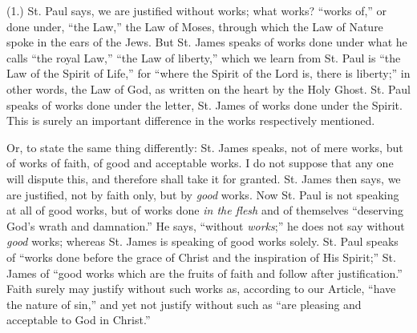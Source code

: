 (1.) St. Paul says, we are justified without works; what works?
``works of,'' or done under, ``the Law,'' the Law of
Moses, through which the Law of Nature spoke in the ears of the
Jews. But St. James speaks of works done under what he calls ``the
royal Law,'' ``the Law of liberty,'' which we learn from
St. Paul is ``the Law of the Spirit of Life,'' for ``where
the Spirit of the Lord is, there is liberty;'' in other words, the
Law of God, as written on the heart by the Holy Ghost. St. Paul speaks
of works done under the letter, St. James of works done under the
Spirit. This is surely an important difference in the works
respectively mentioned.

Or, to state the same thing differently: St. James speaks, not of
mere works, but of works of faith, of good and acceptable works. I do
not suppose that any one will dispute this, and therefore shall take
it for granted. St. James then says, we are justified, not by faith
only, but by \emph{good} works. Now St. Paul is not speaking at all of good
works, but of works done \emph{in the flesh} and of themselves
``deserving God's wrath and damnation.'' He says,
``without \emph{works};'' he does not say without \emph{good}
works; whereas St. James is speaking of good works solely. St. Paul
speaks of ``works done before the grace of Christ and the
inspiration of His Spirit;'' St. James of ``good works which
are the fruits of faith and follow after justification.'' Faith
surely may justify without such works as, according to our Article,
``have the nature of sin,'' and yet not justify without such
as ``are pleasing and acceptable to God in Christ.''

